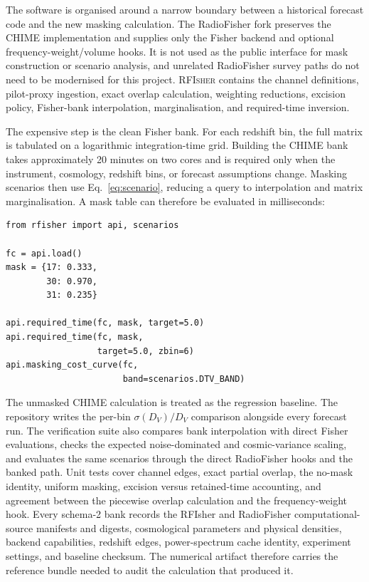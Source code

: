 The software is organised around a narrow boundary between a historical
forecast code and the new masking calculation. The RadioFisher fork
preserves the CHIME implementation and supplies only the Fisher backend
and optional frequency-weight/volume hooks. It is not used as the
public interface for mask construction or scenario analysis, and
unrelated RadioFisher survey paths do not need to be modernised for
this project. \textsc{RFIsher} contains the channel
definitions, pilot-proxy ingestion, exact overlap calculation,
weighting reductions, excision policy, Fisher-bank interpolation,
marginalisation, and required-time inversion.

The expensive step is the clean Fisher bank. For each redshift bin, the
full matrix is tabulated on a logarithmic integration-time grid.
Building the CHIME bank takes approximately 20 minutes on two cores and
is required only when the instrument, cosmology, redshift bins, or
forecast assumptions change. Masking scenarios then use
Eq.~\eqref{eq:scenario}, reducing a query to interpolation and matrix
marginalisation. A mask table can therefore be evaluated in
milliseconds:

\begin{verbatim}
from rfisher import api, scenarios

fc = api.load()
mask = {17: 0.333,
        30: 0.970,
        31: 0.235}

api.required_time(fc, mask, target=5.0)
api.required_time(fc, mask,
                  target=5.0, zbin=6)
api.masking_cost_curve(fc,
                       band=scenarios.DTV_BAND)
\end{verbatim}

The unmasked CHIME calculation is treated as the regression baseline.
The repository writes the per-bin $\sigma(D_V)/D_V$ comparison
alongside every forecast run. The verification suite also compares bank
interpolation with direct Fisher evaluations, checks the expected
noise-dominated and cosmic-variance scaling, and evaluates the same
scenarios through the direct RadioFisher hooks and the banked path.
Unit tests cover channel edges, exact partial overlap, the no-mask
identity, uniform masking, excision versus retained-time accounting,
and agreement between the piecewise overlap calculation and the
frequency-weight hook. Every schema-2 bank records the RFIsher and
RadioFisher computational-source manifests and digests, cosmological
parameters and physical densities, backend capabilities, redshift edges,
power-spectrum cache identity, experiment settings, and baseline checksum.
The numerical artifact therefore carries the reference bundle needed to
audit the calculation that produced it.

